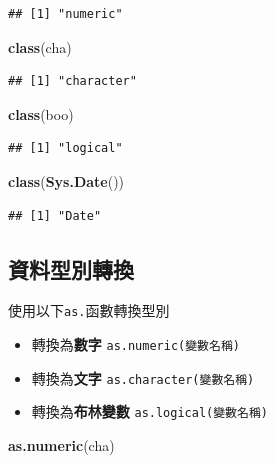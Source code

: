 \documentclass[]{book}
\newenvironment{Shaded}{\begin{snugshade}}{\end{snugshade}}
\newcommand{\KeywordTok}[1]{\textcolor[rgb]{0.13,0.29,0.53}{\textbf{{#1}}}}
\newcommand{\NormalTok}[1]{{#1}}
\providecommand{\tightlist}{%
  \setlength{\itemsep}{0pt}\setlength{\parskip}{0pt}}
\theoremstyle{definition}
\theoremstyle{definition}
\theoremstyle{remark}
\begin{document}
\begin{verbatim}
## [1] "numeric"
\end{verbatim}

\begin{Shaded}
\begin{Highlighting}[]
\KeywordTok{class}\NormalTok{(cha)}
\end{Highlighting}
\end{Shaded}

\begin{verbatim}
## [1] "character"
\end{verbatim}

\begin{Shaded}
\begin{Highlighting}[]
\KeywordTok{class}\NormalTok{(boo)}
\end{Highlighting}
\end{Shaded}

\begin{verbatim}
## [1] "logical"
\end{verbatim}

\begin{Shaded}
\begin{Highlighting}[]
\KeywordTok{class}\NormalTok{(}\KeywordTok{Sys.Date}\NormalTok{())}
\end{Highlighting}
\end{Shaded}

\begin{verbatim}
## [1] "Date"
\end{verbatim}

\subsection{資料型別轉換}

使用以下\texttt{as.}函數轉換型別

\begin{itemize}
\tightlist
\item
  轉換為\textbf{數字} \texttt{as.numeric(變數名稱)}
\item
  轉換為\textbf{文字} \texttt{as.character(變數名稱)}
\item
  轉換為\textbf{布林變數} \texttt{as.logical(變數名稱)}
\end{itemize}

\begin{Shaded}
\begin{Highlighting}[]
\KeywordTok{as.numeric}\NormalTok{(cha)}
\end{Highlighting}
\end{Shaded}
\end{document}
